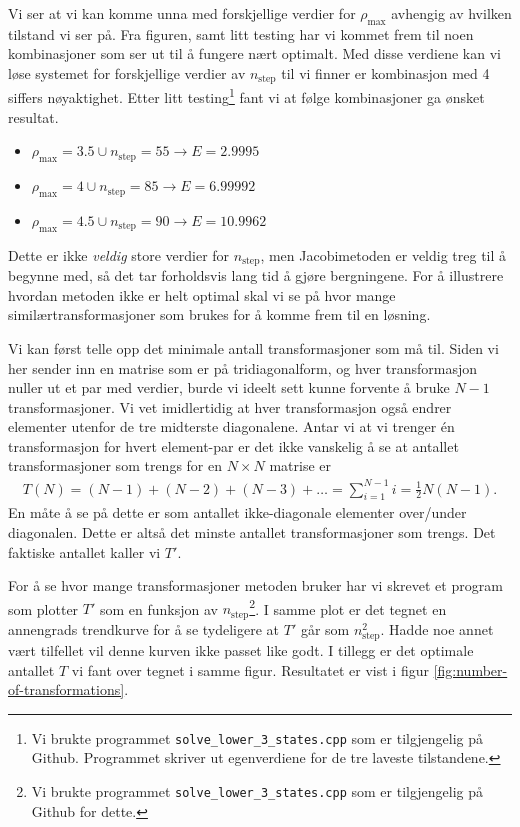 \documentclass[11pt]{article}
\begin{document}
Vi ser at vi kan komme unna med forskjellige verdier for
$\rho_\text{max}$ avhengig av hvilken tilstand vi ser på. Fra figuren,
samt litt testing har vi kommet frem til noen kombinasjoner som ser
ut til å fungere nært optimalt. Med disse verdiene kan vi løse
systemet for forskjellige verdier av $n_\text{step}$ til vi finner er kombinasjon med 4 siffers
nøyaktighet. Etter litt testing\footnote{Vi brukte programmet
  \texttt{solve\_lower\_3\_states.cpp} som er tilgjengelig på Github. Programmet skriver ut egenverdiene for de tre laveste
  tilstandene.} fant vi at følge kombinasjoner ga ønsket resultat. 
\begin{itemize}
  \item[] { $\rho_\text{max} = 3.5 \cup n_\text{step}=55\rightarrow E = 2.9995$}
  \item[] { $\rho_\text{max} = 4   \cup n_\text{step}=85\rightarrow E = 6.99992$}
  \item[] { $\rho_\text{max} = 4.5 \cup n_\text{step}=90\rightarrow E = 10.9962$}
\end{itemize}

Dette er ikke \emph{veldig} store verdier for $n_\text{step}$, men
Jacobimetoden er veldig treg til å begynne med, så det tar forholdsvis
lang tid å gjøre bergningene. For å illustrere hvordan metoden ikke er
helt optimal skal vi se på hvor mange similærtransformasjoner som
brukes for å komme frem til en løsning.

Vi kan først telle opp det minimale antall transformasjoner som må
til. Siden vi her sender inn en matrise som er på tridiagonalform, og
hver transformasjon nuller ut et par med verdier, burde vi ideelt sett kunne
forvente å bruke $N-1$ transformasjoner. Vi vet imidlertidig at hver 
transformasjon også endrer elementer utenfor de tre midterste diagonalene.
Antar vi at vi trenger én transformasjon for hvert element-par er det ikke
vanskelig å se at antallet transformasjoner som trengs for en $N \times N$ 
matrise er
\begin{align*}
  T(N) = (N-1) + (N-2) + (N-3) + \dots = \sum_{i=1}^{N-1}i = \frac{ 1 }{ 2 }N(N-1).
\end{align*}
En måte å se på dette er som antallet ikke-diagonale elementer
over/under diagonalen. Dette er altså det minste antallet
transformasjoner som trengs. Det faktiske antallet kaller vi $T'$.

For å se hvor mange transformasjoner metoden bruker har vi skrevet et
program som plotter $T'$ som en funksjon av $n_\text{step}$\footnote{Vi brukte programmet
  \texttt{solve\_lower\_3\_states.cpp} som er tilgjengelig på Github for
  dette.}. I samme plot er det tegnet en annengrads trendkurve for å
se tydeligere at $T'$ går som $n_\text{step}^2$. Hadde noe annet
vært tilfellet vil denne kurven ikke passet like godt. I tillegg er
det optimale antallet $T$ vi fant over tegnet i samme figur. Resultatet er vist i
figur \ref{fig:number-of-transformations}. 
\end{document}
